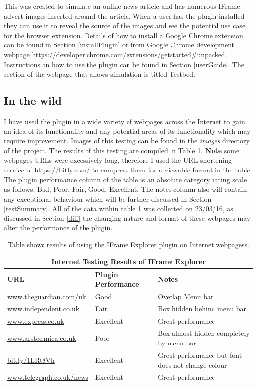\documentclass[12pt]{article}
\begin{document}
This was created to simulate an online news article and has numerous IFrame advert images inserted around the article. When a user has the plugin installed they can use it to reveal the source of the images and see the potential use case for the browser extension. Details of how to install a Google Chrome extension can be found in Section \ref{installPlugin} or from Google Chrome development webpage \url{https://developer.chrome.com/extensions/getstarted#unpacked}. Instructions on how to use the plugin can be found in Section \ref{userGuide}. The section of the webpage that allows simulation is titled Testbed. 

\subsection{In the wild} \label{ieWild}
I have used the plugin in a wide variety of webpages across the Internet to gain an idea of its functionality and any potential areas of its functionality which may require improvement. Images of this testing can be found in the \textit{images} directory of the project. The results of this testing are compiled in Table \ref{table:2}. \textbf{Note} some webpages URLs were excessively long, therefore I used the URL shortening service of \url{https://bitly.com/} to compress them for a viewable format in the table. The plugin performance column of the table is an absolute category rating scale as follows: Bad, Poor, Fair, Good, Excellent. The notes column also will contain any exceptional behaviour which will be further discussed in Section \ref{testSummary}. All of the data within table \ref{table:2} was collected on 23/03/16, as discussed in Section \ref{diff} the changing nature and format of these webpages may alter the performance of the plugin. \\

{
\begin{table} [H]
\centering
\begin{tabular}{ |p{5cm}|p{5cm}|p{5cm}|  }
\hline
\multicolumn{3}{|c|}{\textbf{Internet Testing Results of IFrame Explorer}} \\
\hline
\textbf{URL} & \textbf{Plugin Performance} & \textbf{Notes} \\
\hline
\url{www.theguardian.com/uk} & Good & Overlap Menu bar \\
\hline
\url{www.independent.co.uk} & Fair & Box hidden behind menu bar \\
\hline
\url{www.express.co.uk} & Excellent & Great performance \\
\hline
\url{www.arstechnica.co.uk} & Poor & Box almost hidden completely by menu bar  \\
\hline
\url{bit.ly/1LRt8Vh} & Excellent & Great performance but font does not change colour \\
\hline
\url{www.telegraph.co.uk/news} & Excellent & Great performance   \\
\hline
\end{tabular}
\caption{Table shows results of using the IFrame Explorer plugin on Internet webpagess.}
\label{table:2}
\end{table}
}
\end{document}
